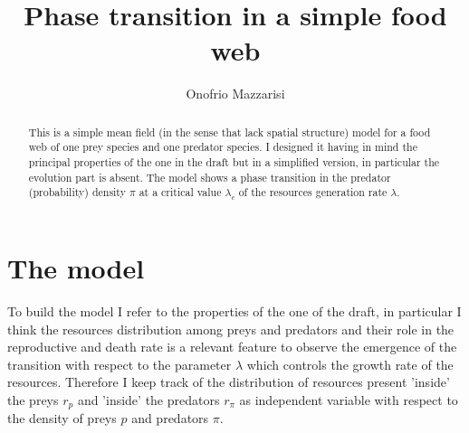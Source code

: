 \documentclass[10pt]{article}
\title{{\bf Phase transition in a simple food web}}
\author{Onofrio Mazzarisi}
\affil{{\it Max Planck Institute for Mathematics in the Sciences, Leipzig, Germany}}
\begin{document}

\maketitle

\begin{abstract}
This is a simple mean field (in the sense that lack spatial structure) model for a food web of one prey species
and one predator species. I designed it having in mind the principal properties of the one in the draft
but in a simplified version, in particular the evolution part is absent. 
The model shows a phase transition in the predator (probability) density \(\pi\) at a critical
value \(\lambda_c\) of the resources generation rate \(\lambda\).
\end{abstract} 

\section{The model}

To build the model I refer to the properties of the one of the draft, in particular I think the resources
distribution among preys and predators and their role in the reproductive and death rate is a relevant
feature to observe the emergence of the transition with respect to the parameter \(\lambda\) which
controls the growth rate of the resources. Therefore I keep track of the distribution of
resources present 'inside' the preys \(r_p\) and 'inside' the predators \(r_\pi\) as
independent variable with respect to the density of preys \(p\) and predators \(\pi\).
\end{document}
